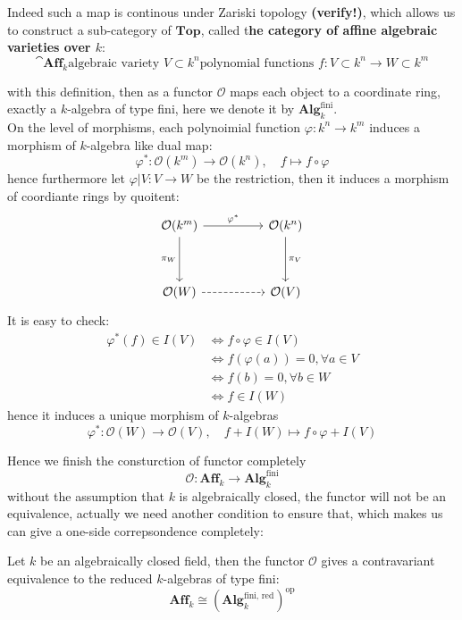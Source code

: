 \documentclass[12pt,a4paper]{article}
\begin{document}
Indeed such a map is continous under Zariski topology \textbf{(verify!)}, which allows us to construct a sub-category of \(\mathbf{Top}\), called t\textbf{he category of affine algebraic varieties over \(k\)}:
\[\cat{\mathbf{Aff}_k}{\text{algebraic variety } V \subset k^n}{\text{polynomial functions } f: V\subset k^n \to W \subset k^m}\]

with this definition, then as a functor \(\mathcal{O}\) maps each object to a coordinate ring, exactly a \(k\)-algebra of type fini, here we denote it by \(\mathbf{Alg}_k^{\text{fini}}\).\\

On the level of morphisms, each polynoimial function \(\varphi:k^n \to k^m\) induces a morphism of \(k\)-algebra like dual map:
\[\varphi^*: \mathcal{O}(k^m) \to \mathcal{O}(k^n), \quad f \mapsto f\circ \varphi \]
hence furthermore let \(\varphi|V:V \to W\) be the restriction, then it induces a morphism of coordiante rings by quoitent:
\[\begin{tikzcd}
	{\mathcal{O}(k^m)} && {\mathcal{O}(k^n)} \\
	\\
	{\mathcal{O}(W)} && {\mathcal{O}(V)}
	\arrow["{\varphi^*}", from=1-1, to=1-3]
	\arrow["{\pi_W}"', from=1-1, to=3-1]
	\arrow["{\pi_V}", from=1-3, to=3-3]
	\arrow[dashed, from=3-1, to=3-3]
\end{tikzcd}\]
It is easy to check:
\begin{align*}
    \varphi^*(f) \in I(V) &\iff f \circ \varphi \in I(V) \\
    &\iff f(\varphi(a)) = 0, \forall a \in V\\
    &\iff f(b) = 0, \forall b \in W \quad\\
    &\iff f \in I(W)
\end{align*}
hence it induces a unique morphism of \(k\)-algebras
\[\varphi^*: \mathcal{O}(W) \to \mathcal{O}(V), \quad f+I(W) \mapsto f \circ \varphi + I(V)\]

Hence we finish the consturction of functor completely
\[\mathcal{O}: \mathbf{Aff}_k \to \mathbf{Alg}_k^{\text{fini}}\]
without the assumption that \(k\) is algebraically closed, the functor will not be an equivalence, actually we need another condition to ensure that, which makes us can give a one-side correpsondence completely:
\begin{theorem}
    Let \(k\) be an algebraically closed field, then the functor \(\mathcal{O}\) gives a contravariant equivalence to the reduced \(k\)-algebras of type fini:
    \[\mathbf{Aff}_k \cong (\mathbf{Alg}_k^{\text{fini, red}})^{\text{op}}\]
\end{theorem}
\end{document}
